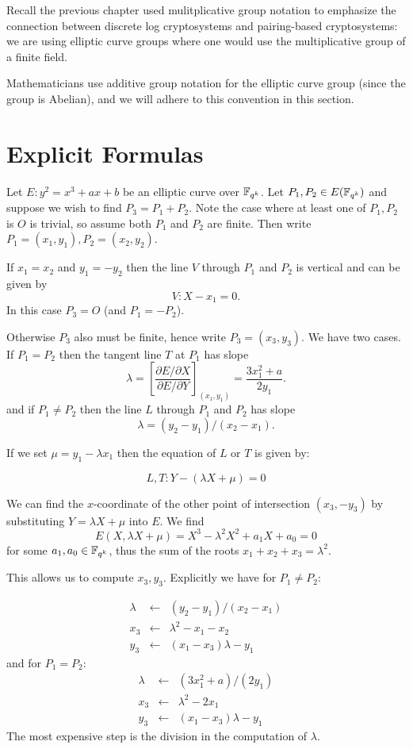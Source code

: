 Recall the previous chapter used mulitplicative group notation to emphasize
the connection
between discrete log cryptosystems and pairing-based cryptosystems:
we are using elliptic curve groups where one would use
the multiplicative group of a finite field.

Mathematicians use additive group notation for the elliptic curve group
(since the group is Abelian), and we will adhere to this convention in this
section.

\section {Explicit Formulas}

Let $E: y^2 = x^3 + ax + b$ be an elliptic curve over $\mathbb{F}_{q^k}$. Let
$P_1, P_2 \in E(\mathbb{F}_{q^k})$ and suppose
we wish to find $P_3 = P_1 + P_2$.
Note the case where at least one of $P_1, P_2$ is $O$ is trivial,
so assume both $P_1$ and $P_2$ are finite.
Then write $P_1 = (x_1, y_1), P_2 = (x_2, y_2)$.

If $x_1 = x_2$ and $y_1 = -y_2$
then the line $V$ through $P_1$ and $P_2$ is vertical and
can be given by
\[ V : X - x_1 = 0  . \]
In this case $P_3 = O$ (and $P_1 = -P_2$).

Otherwise $P_3$ also must be finite, hence write $P_3 = (x_3, y_3)$.
We have two cases. If $P_1 = P_2$ then the tangent line $T$ at
$P_1$
has slope
\[\lambda =
\left[ \frac{\partial E / \partial X}{\partial E/ \partial Y} \right]_{(x_1,y_1)}
= \frac{3x_1^2 + a}{2y_1} . \]
and if $P_1 \ne P_2$ then the line $L$ through $P_1$ and $P_2$ has slope
\[ \lambda = (y_2 - y_1)/(x_2 - x_1) . \]

If we set $\mu = y_1 - \lambda x_1$ then
the equation of $L$ or $T$ is given by:

\[ L, T :  Y - (\lambda X + \mu) = 0 \]

We can find the $x$-coordinate of the other point of intersection $(x_3, -y_3)$
by substituting $Y = \lambda X + \mu$ into $E$. We find
\[ E(X, \lambda X+\mu) = X^3 - \lambda^2 X^2 + a_1 X + a_0 = 0 \]
for some $a_1, a_0 \in \mathbb{F}_{q^k}$, thus the sum of the roots
$x_1 + x_2 + x_3 = \lambda^2$.

This allows us to compute $x_3, y_3$. Explicitly we have for $P_1 \ne P_2$:

\[
\begin{array}{rcl}
\lambda &\gets& (y_2 - y_1)/(x_2 - x_1) \\
x_3 &\gets& \lambda^2 - x_1 - x_2 \\
y_3 &\gets& (x_1 - x_3) \lambda - y_1
\end{array}
\]
and for $P_1 = P_2$:
\[
\begin{array}{rcl}
\lambda &\gets& (3x_1^2 + a)/(2y_1) \\
x_3 &\gets& \lambda^2 - 2x_1 \\
y_3 &\gets& (x_1 - x_3) \lambda - y_1
\end{array}
\]
The most expensive step is the division in the computation of
$\lambda$.

